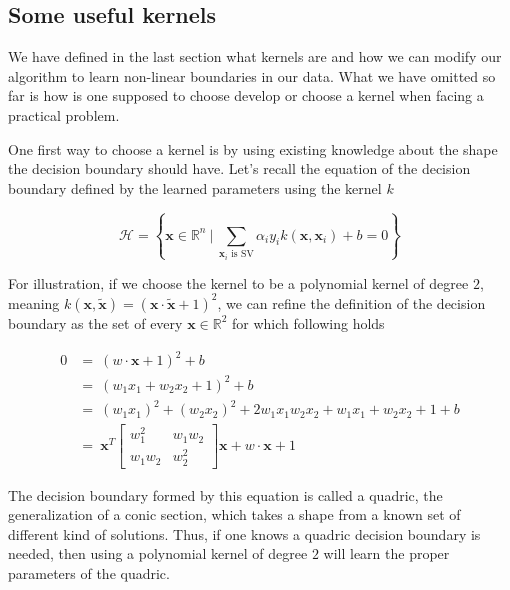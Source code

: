 \subsection {Some useful kernels}

We have defined in the last section what kernels are and how we can modify our algorithm to learn non-linear boundaries in our data. What we have omitted so far is how is one supposed to choose develop or choose a kernel when facing a practical problem.

One first way to choose a kernel is by using existing knowledge about the shape the decision boundary should have. Let's recall the equation of the decision boundary defined by the learned parameters using the kernel $k$

\begin{equation*}
  \mathscr{H} = \left\{\mathbf{x} \in \mathbb{R}^n\ |\ \sum_{\mathbf{x}_i \text{ is SV}}\alpha_iy_ik\left(\mathbf{x}, \mathbf{x}_i\right) + b = 0\right\}
\end{equation*}

For illustration, if we choose the kernel to be a polynomial kernel of degree $2$, meaning $k\left(\mathbf{x}, \mathbf{\tilde{x}}\right) = \left(\mathbf{x} \cdot \mathbf{\tilde{x}} + 1\right)^2$, we can refine the definition of the decision boundary as the set of every $\mathbf{x} \in \mathbb{R}^2$ for which following holds

\begin{equation*}
  \begin{aligned}
    0 &=\ \left(w \cdot \mathbf{x} + 1\right)^2 + b\\
      &=\ \left(w_1x_1 + w_2x_2 + 1\right)^2 + b\\
      &=\ (w_1x_1)^2 + (w_2x_2)^2 + 2w_1x_1w_2x_2 + w_1x_1 + w_2x_2 + 1 + b\\
      &=\ \mathbf{x}^T\begin{bmatrix}w_1^2 & w_1w_2\\ w_1w_2 & w_2^2\end{bmatrix}\mathbf{x} + w \cdot \mathbf{x} + 1 
  \end{aligned}
\end{equation*}

The decision boundary formed by this equation is called a quadric, the generalization of a conic section, which takes a shape from a known set of different kind of solutions. Thus, if one knows a quadric decision boundary is needed, then using a polynomial kernel of degree $2$ will learn the proper parameters of the quadric.

